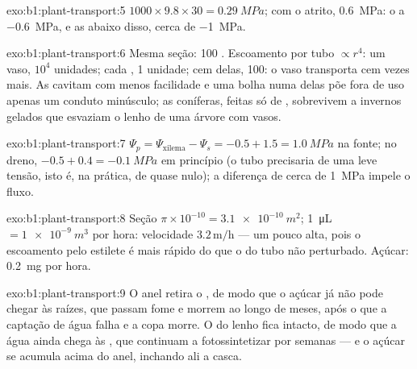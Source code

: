 \begin{solution}{exo:b1:plant-transport:5}
$1000\times 9.8\times 30 = \qty{0.29}{MPa}$; com o atrito,
\qty{0.6}{MPa}: o  a \qty{-0.6}{MPa}, e as  abaixo disso,
cerca de \qty{-1}{MPa}.
\end{solution}

\begin{solution}{exo:b1:plant-transport:6}
Mesma seção: 100 . Escoamento por tubo $\propto r^4$: um
vaso, $10^4$ unidades; cada , 1 unidade; cem delas, 100: o
vaso transporta cem vezes mais. As  cavitam com menos
facilidade e uma bolha numa delas põe fora de uso apenas um conduto
minúsculo; as coníferas, feitas só de , sobrevivem a
invernos gelados que esvaziam o lenho de uma árvore com vasos.
\end{solution}

\begin{solution}{exo:b1:plant-transport:7}
$\Psi_p = \Psi_{\text{xilema}} - \Psi_s = -0.5 + 1.5 = \qty{1.0}{MPa}$
na fonte; no dreno, $-0.5 + 0.4 = \qty{-0.1}{MPa}$ em princípio (o tubo
precisaria de uma leve tensão, isto é, na prática, de 
quase nulo); a diferença de cerca de \qty{1}{MPa} impele o fluxo.
\end{solution}

\begin{solution}{exo:b1:plant-transport:8}
Seção $\pi\times 10^{-10} = \qty{3.1e-10}{m^2}$; \qty{1}{\micro L}
$= \qty{1e-9}{m^3}$ por hora: velocidade $3.2\,\mathrm{m/h}$ --- um
pouco alta, pois o escoamento pelo estilete é mais rápido do que o do
tubo não perturbado. Açúcar: \qty{0.2}{mg} por hora.
\end{solution}

\begin{solution}{exo:b1:plant-transport:9}
O anel retira o , de modo que o açúcar já não pode chegar às
raízes, que passam fome e morrem ao longo de meses, após o que a
captação de água falha e a copa morre. O  do lenho fica intacto,
de modo que a água ainda chega às , que continuam a
fotossintetizar por semanas --- e o açúcar se acumula acima do anel,
inchando ali a casca.
\end{solution}

